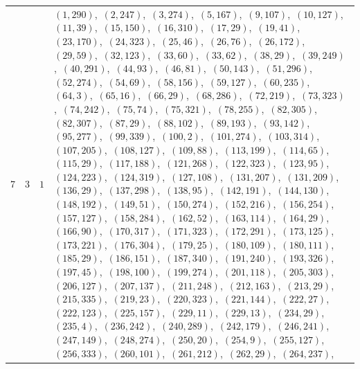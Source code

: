\documentclass[11pt]{article}
\begin{document}
\begin{longtable}{@{}rrl>{\raggedright\arraybackslash}p{}@{}}
7 & 3 & $1$ & $(1,290)$,\allowbreak\ $(2,247)$,\allowbreak\ $(3,274)$,\allowbreak\ $(5,167)$,\allowbreak\ $(9,107)$,\allowbreak\ $(10,127)$,\allowbreak\ $(11,39)$,\allowbreak\ $(15,150)$,\allowbreak\ $(16,310)$,\allowbreak\ $(17,29)$,\allowbreak\ $(19,41)$,\allowbreak\ $(23,170)$,\allowbreak\ $(24,323)$,\allowbreak\ $(25,46)$,\allowbreak\ $(26,76)$,\allowbreak\ $(26,172)$,\allowbreak\ $(29,59)$,\allowbreak\ $(32,123)$,\allowbreak\ $(33,60)$,\allowbreak\ $(33,62)$,\allowbreak\ $(38,29)$,\allowbreak\ $(39,249)$,\allowbreak\ $(40,291)$,\allowbreak\ $(44,93)$,\allowbreak\ $(46,81)$,\allowbreak\ $(50,143)$,\allowbreak\ $(51,296)$,\allowbreak\ $(52,274)$,\allowbreak\ $(54,69)$,\allowbreak\ $(58,156)$,\allowbreak\ $(59,127)$,\allowbreak\ $(60,235)$,\allowbreak\ $(64,3)$,\allowbreak\ $(65,16)$,\allowbreak\ $(66,29)$,\allowbreak\ $(68,286)$,\allowbreak\ $(72,219)$,\allowbreak\ $(73,323)$,\allowbreak\ $(74,242)$,\allowbreak\ $(75,74)$,\allowbreak\ $(75,321)$,\allowbreak\ $(78,255)$,\allowbreak\ $(82,305)$,\allowbreak\ $(82,307)$,\allowbreak\ $(87,29)$,\allowbreak\ $(88,102)$,\allowbreak\ $(89,193)$,\allowbreak\ $(93,142)$,\allowbreak\ $(95,277)$,\allowbreak\ $(99,339)$,\allowbreak\ $(100,2)$,\allowbreak\ $(101,274)$,\allowbreak\ $(103,314)$,\allowbreak\ $(107,205)$,\allowbreak\ $(108,127)$,\allowbreak\ $(109,88)$,\allowbreak\ $(113,199)$,\allowbreak\ $(114,65)$,\allowbreak\ $(115,29)$,\allowbreak\ $(117,188)$,\allowbreak\ $(121,268)$,\allowbreak\ $(122,323)$,\allowbreak\ $(123,95)$,\allowbreak\ $(124,223)$,\allowbreak\ $(124,319)$,\allowbreak\ $(127,108)$,\allowbreak\ $(131,207)$,\allowbreak\ $(131,209)$,\allowbreak\ $(136,29)$,\allowbreak\ $(137,298)$,\allowbreak\ $(138,95)$,\allowbreak\ $(142,191)$,\allowbreak\ $(144,130)$,\allowbreak\ $(148,192)$,\allowbreak\ $(149,51)$,\allowbreak\ $(150,274)$,\allowbreak\ $(152,216)$,\allowbreak\ $(156,254)$,\allowbreak\ $(157,127)$,\allowbreak\ $(158,284)$,\allowbreak\ $(162,52)$,\allowbreak\ $(163,114)$,\allowbreak\ $(164,29)$,\allowbreak\ $(166,90)$,\allowbreak\ $(170,317)$,\allowbreak\ $(171,323)$,\allowbreak\ $(172,291)$,\allowbreak\ $(173,125)$,\allowbreak\ $(173,221)$,\allowbreak\ $(176,304)$,\allowbreak\ $(179,25)$,\allowbreak\ $(180,109)$,\allowbreak\ $(180,111)$,\allowbreak\ $(185,29)$,\allowbreak\ $(186,151)$,\allowbreak\ $(187,340)$,\allowbreak\ $(191,240)$,\allowbreak\ $(193,326)$,\allowbreak\ $(197,45)$,\allowbreak\ $(198,100)$,\allowbreak\ $(199,274)$,\allowbreak\ $(201,118)$,\allowbreak\ $(205,303)$,\allowbreak\ $(206,127)$,\allowbreak\ $(207,137)$,\allowbreak\ $(211,248)$,\allowbreak\ $(212,163)$,\allowbreak\ $(213,29)$,\allowbreak\ $(215,335)$,\allowbreak\ $(219,23)$,\allowbreak\ $(220,323)$,\allowbreak\ $(221,144)$,\allowbreak\ $(222,27)$,\allowbreak\ $(222,123)$,\allowbreak\ $(225,157)$,\allowbreak\ $(229,11)$,\allowbreak\ $(229,13)$,\allowbreak\ $(234,29)$,\allowbreak\ $(235,4)$,\allowbreak\ $(236,242)$,\allowbreak\ $(240,289)$,\allowbreak\ $(242,179)$,\allowbreak\ $(246,241)$,\allowbreak\ $(247,149)$,\allowbreak\ $(248,274)$,\allowbreak\ $(250,20)$,\allowbreak\ $(254,9)$,\allowbreak\ $(255,127)$,\allowbreak\ $(256,333)$,\allowbreak\ $(260,101)$,\allowbreak\ $(261,212)$,\allowbreak\ $(262,29)$,\allowbreak\ $(264,237)$,\allowbreak\ 
\end{longtable}
\end{document}
